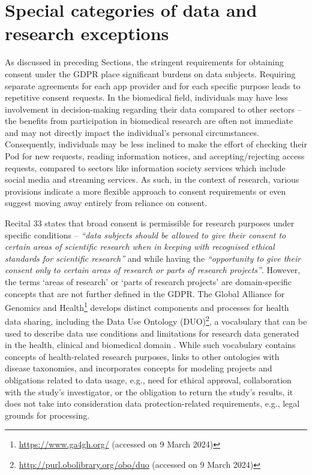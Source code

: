 \section{Special categories of data and research exceptions}
\label{sec:biomedical_exception}

As discussed in preceding Sections, the stringent requirements for obtaining consent under the GDPR place significant burdens on data subjects.
Requiring separate agreements for each app provider and for each specific purpose leads to repetitive consent requests.
In the biomedical field, individuals may have less involvement in decision-making regarding their data compared to other sectors -- the benefits from participation in biomedical research are often not immediate and may not directly impact the individual's personal circumstances.
Consequently, individuals may be less inclined to make the effort of checking their Pod for new requests, reading information notices, and accepting/rejecting access requests, compared to sectors like information society services which include social media and streaming services.
As such, in the context of research, various provisions indicate a more flexible approach to consent requirements or even suggest moving away entirely from reliance on consent.

Recital 33 \citeyearpar{noauthor_regulation_2016} states that broad consent is permissible for research purposes under specific conditions -- \textit{``data subjects should be allowed to give their consent to certain areas of scientific research when in keeping with recognised ethical standards for scientific research''} and while having the \textit{``opportunity to give their consent only to certain areas of research or parts of research projects''}.
However, the terms `areas of research' or `parts of research projects' are domain-specific concepts that are not further defined in the GDPR.
The Global Alliance for Genomics and Health\footnote{\url{https://www.ga4gh.org/} (accessed on 9 March 2024)} develops distinct components and processes for health data sharing, including the Data Use Ontology (DUO)\footnote{\url{http://purl.obolibrary.org/obo/duo} (accessed on 9 March 2024)}, a vocabulary that can be used to describe data use conditions and limitations for research data generated in the health, clinical and biomedical domain \citep{lawson_data_2021,rehm_ga4gh_2021}.
While such vocabulary contains concepts of health-related research purposes, links to other ontologies with disease taxonomies, and incorporates concepts for modeling projects and obligations related to data usage, e.g., need for ethical approval, collaboration with the study's investigator, or the obligation to return the study's results, it does not take into consideration data protection-related requirements, e.g., legal grounds for processing.

